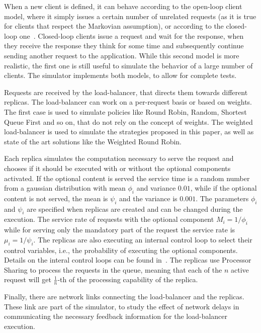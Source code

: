 When a new client is defined, it can behave according to the open-loop
client model, where it simply issues a certain number of unrelated
requests (as it is true for clients that respect the Markovian
assumption), or according to the closed-loop
one~\cite{openvsclosed}. Closed-loop clients issue a request and wait
for the response, when they receive the response they think for some
time and subsequently continue sending another request to the
application. While this second model is more realistic, the first one
is still useful to simulate the behavior of a large number of
clients. The simulator implements both models, to allow for complete
tests.

Requests are received by the load-balancer, that directs them towards
different replicas. The load-balancer can work on a per-request basis
or based on weights. The first case is used to simulate policies like
Round Robin, Random, Shortest Queue First and so on, that do not rely
on the concept of weights. The weighted load-balancer is used to
simulate the strategies proposed in this paper, as well as state of
the art solutions like the Weighted Round Robin.

Each replica simulates the computation necessary to serve the request
and chooses if it should be executed with or without the optional
components activated. If the optional content is served the service
time is a random number from a gaussian distribution with mean
$\phi_i$ and variance $0.01$, while if the optional content is not
served, the mean is $\psi_i$ and the variance is $0.001$. The
parameters $\phi_i$ and $\psi_i$ are specified when replicas are
created and can be changed during the execution. The service rate of
requests with the optional component $M_i = 1/\phi_i$ while for
serving only the mandatory part of the request the service rate is
$\mu_i = 1/\psi_i$. The replicas are also executing an internal
control loop to select their control variables, i.e., the probability
of executing the optional components. Details on the interal control
loops can be found in~\cite{cloudish-tr}. The replicas use Processor
Sharing to process the requests in the queue, meaning that each of the
$n$ active request will get $\frac{1}{n}$-th of the processing
capability of the replica.

Finally, there are network links connecting the load-balancer and the
replicas. These link are part of the simulator, to study the effect of
network delays in communicating the necessary feedback information for
the load-balancer execution.

